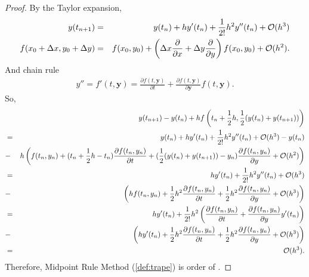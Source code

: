 \documentclass[12pt]  {article}%
\begin{document}
\begin{proof}
By the Taylor expansion,
 \begin{eqnarray}\label{eqn:midtay}
 y(t_{n+1})&=&y(t_n)+hy'(t_n)+\frac{1}{2!}h^2y''(t_n)+\mathcal{O}{(h^3)}\\
 f(x_0+\Delta x, y_0+\Delta y)&=&f(x_0,y_0)+\left( \Delta x\frac{\partial}{\partial x}+\Delta y\frac{\partial}{\partial y}\right)f(x_0,y_0)+\mathcal{O}{(h^2)}.
 \end{eqnarray}
And chain rule
\begin{eqnarray}\label{eqn:midtay}
y''=f'(t, \textbf{y})=\frac{\partial  f(t, \textbf{y})}{\partial t}+\frac{\partial  f(t, \textbf{y})}{\partial \textbf{y}}  f(t, \textbf{y}).
\end{eqnarray}
So,
 \allowdisplaybreaks
 \begin{eqnarray}\label{eqn:middiff1}
&& y(t_{n+1})-y(t_n)+h f\left(t_n+\frac{1}{2}h,\frac{1}{2}(y(t_n)+y(t_{n+1}))\right)\nonumber\\
&=&y(t_n)+hy'(t_n)+\frac{1}{2!}h^2y''(t_n)+\mathcal{O}{(h^3)}-y(t_n)\nonumber\\
&-&h\left(f(t_n,y_n)+(t_n+\frac{1}{2}h-t_n)\frac{\partial f(t_n,y_n)}{\partial t}+(\frac{1}{2}(y(t_n)+y(t_{n+1}))-y_n)\frac{\partial f(t_n,y_n)}{\partial y}+\mathcal{O}(h^2)\right)\nonumber\\
&=&hy'(t_n)+\frac{1}{2!}h^2y''(t_n)+\mathcal{O}{(h^3)}\nonumber\\
&-&\left( hf(t_n,y_n)+\frac{1}{2}h^2\frac{\partial f(t_n,y_n)}{\partial t}+\frac{1}{2}h^2\frac{\partial f(t_n,y_n)}{\partial y}+\mathcal{O}(h^3)\right)\nonumber\\
 &=&hy'(t_n)+\frac{1}{2!}h^2\left(\frac{\partial f(t_n,y_n)}{\partial t}+\frac{\partial f(t_n,y_n)}{\partial y}y'(t_n) \right)\nonumber\\
&-&\left( hy'(t_n)+\frac{1}{2}h^2\frac{\partial f(t_n,y_n)}{\partial t}+\frac{1}{2}h^2\frac{\partial f(t_n,y_n)}{\partial y}+\mathcal{O}(h^3)\right)\nonumber\\
 &=&\mathcal{O}{(h^3)}\nonumber.
\end{eqnarray}
Therefore, Midpoint Rule Method (\ref{def:trape}) is order of .
\end{proof}
\end{document}
